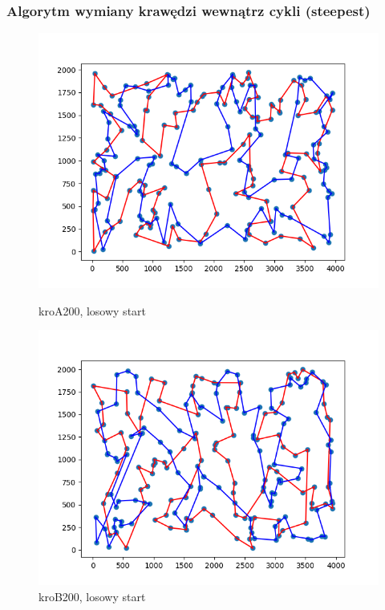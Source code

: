 \documentclass[11pt]{article}
\begin{document}
\subsubsection{Algorytm wymiany krawędzi wewnątrz cykli (steepest)}
\begin{figure}[H]
    \centering
    \begin{minipage}[t]{0.45\textwidth}
        \centering
        \includegraphics[width=\linewidth]{best_paths/kroA200/traverse_steepest/randomstart}
        \caption{kroA200, losowy start}
    \end{minipage}
    \hfill
    \begin{minipage}[t]{0.45\textwidth}
        \centering
        \includegraphics[width=\linewidth]{best_paths/kroB200/traverse_steepest/randomstart}
        \caption{kroB200, losowy start}
    \end{minipage}


\end{figure}
\end{document}
